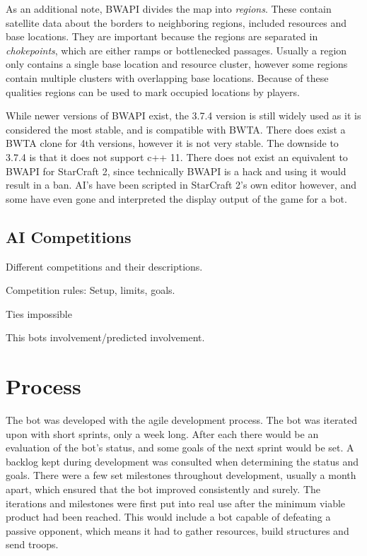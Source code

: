 	As an additional note, BWAPI divides the map into \emph{regions}. These contain satellite data about the borders to neighboring regions, included resources and base locations. They are important because the regions are separated in \emph{chokepoints}, which are either ramps or bottlenecked passages. Usually a region only contains a single base location and resource cluster, however some regions contain multiple clusters with overlapping base locations. Because of these qualities regions can be used to mark occupied locations by players.
	
	While newer versions of BWAPI exist, the 3.7.4 version is still widely used as it is considered the most stable, and is compatible with BWTA. There does exist a BWTA clone for 4th versions, however it is not very stable. The downside to 3.7.4 is that it does not support c++ 11. There does not exist an equivalent to BWAPI for StarCraft 2, since technically BWAPI is a hack and using it would result in a ban. AI's have been scripted in StarCraft 2's own editor however, and some have even gone and interpreted the display output of the game for a bot.
	
	\subsection*{AI Competitions}
	Different competitions and their descriptions.
	
	Competition rules: Setup, limits, goals.
	
	Ties impossible
	
	This bots involvement/predicted involvement.

\section{Process}
The bot was developed with the agile development process. The bot was iterated upon with short sprints, only a week long. After each there would be an evaluation of the bot's status, and some goals of the next sprint would be set. A backlog kept during development was consulted when determining the status and goals. There were a few set milestones throughout development, usually a month apart, which ensured that the bot improved consistently and surely. The iterations and milestones were first put into real use after the minimum viable product had been reached. This would include a bot capable of defeating a passive opponent, which means it had to gather resources, build structures and send troops.

